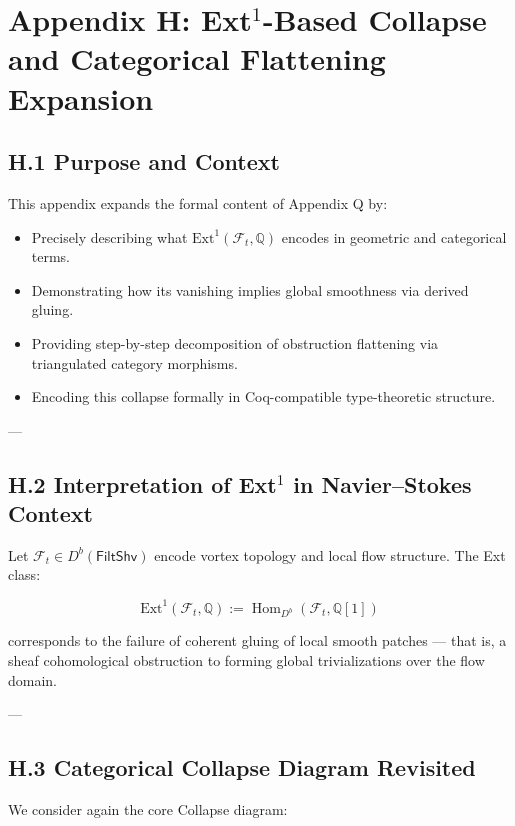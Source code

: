 \documentclass[11pt]{article}
\begin{document}
{{\section*{Appendix H: Ext$^1$-Based Collapse and Categorical Flattening Expansion}

\subsection*{H.1 Purpose and Context}

This appendix expands the formal content of Appendix Q by:

\begin{itemize}
  \item Precisely describing what \( \mathrm{Ext}^1(\mathcal{F}_t, \mathbb{Q}) \) encodes in geometric and categorical terms.
  \item Demonstrating how its vanishing implies global smoothness via derived gluing.
  \item Providing step-by-step decomposition of obstruction flattening via triangulated category morphisms.
  \item Encoding this collapse formally in Coq-compatible type-theoretic structure.
\end{itemize}

---

\subsection*{H.2 Interpretation of Ext$^1$ in Navier–Stokes Context}

Let \( \mathcal{F}_t \in D^b(\mathsf{FiltShv}) \) encode vortex topology and local flow structure.  
The Ext class:

\[
\mathrm{Ext}^1(\mathcal{F}_t, \mathbb{Q}) := \operatorname{Hom}_{D^b}(\mathcal{F}_t, \mathbb{Q}[1])
\]

corresponds to the failure of coherent gluing of local smooth patches —  
that is, a sheaf cohomological obstruction to forming global trivializations over the flow domain.

---

\subsection*{H.3 Categorical Collapse Diagram Revisited}

We consider again the core Collapse diagram:

}}
\end{document}
